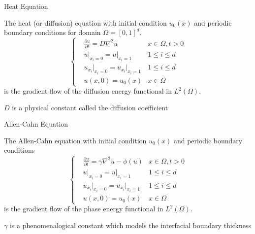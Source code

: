 \documentclass[professionalfont]{beamer}
\theoremstyle{remark}
\begin{document}
\begin{frame}{Heat Equation}
	
	The heat (or diffusion) equation with initial condition $u_0(x)$ and periodic boundary conditions for domain $\Omega=[0,1]^d$.
	\begin{equation} \label{eq_HE}
		\left\{
			\begin{split}
				&\frac{\partial u}{\partial t}=D\nabla^2u&x\in\Omega,t>0\\
				&u\big|_{x_i=0}=u\big|_{x_i=1}&1\le i\le d\\
				&u_{x_i}\big|_{x_i=0}=u_{x_i}\big|_{x_i=1}&1\le i\le d\\
				&u(x,0)=u_0(x)&x\in\Omega
			\end{split}	
		\right.
	\end{equation}
	is the gradient flow of the diffusion energy functional in $L^2(\Omega)$.	

	\vspace{10 pt}

	$D$ is a physical constant called the diffusion coefficient
	
\end{frame}

\begin{frame}{Allen-Cahn Equation}
	
	The Allen-Cahn equation with initial condition $u_0(x)$ and periodic boundary conditions
	\begin{equation} \label{eq_AC}
		\left\{
			\begin{split}
				&\frac{\partial u}{\partial t}=\gamma\nabla^2u-\phi(u)&x\in\Omega,t>0\\
				&u\big|_{x_i=0}=u\big|_{x_i=1}&1\le i\le d\\
				&u_{x_i}\big|_{x_i=0}=u_{x_i}\big|_{x_i=1}&1\le i\le d\\
				&u(x,0)=u_0(x)&x\in\Omega
			\end{split}	
		\right.
	\end{equation}
	is the gradient flow of the phase energy functional in $L^2(\Omega)$.

	\vspace*{10 pt}
	$\gamma$ is a phenomenalogical constant which models the interfacial boundary thickness
	
\end{frame}
\end{document}
